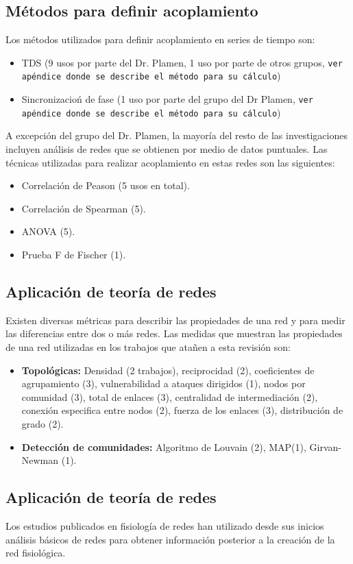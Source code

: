 \documentclass[twoside,twocolumn]{article}
\begin{document}
\subsection{Métodos para definir acoplamiento}
Los métodos utilizados para definir acoplamiento en series de tiempo son:
\begin{itemize}
  \item TDS (9 usos por parte del Dr. Plamen, 1 uso por parte de otros grupos, \texttt{ver apéndice donde se describe el método para su cálculo})
  \item Sincronizacioń de fase (1 uso por parte del grupo del Dr Plamen, \texttt{ver apéndice donde se describe el método para su cálculo})
\end{itemize}
A excepción del grupo del Dr. Plamen, la mayoría del resto de las investigaciones incluyen análisis de redes que se obtienen por medio de datos puntuales.
Las técnicas utilizadas para realizar acoplamiento en estas redes son las siguientes:
\begin{itemize}
  \item Correlación de Peason (5 usos en total).
  \item Correlación de Spearman (5).
  \item ANOVA (5).
  \item Prueba F de Fischer (1).
\end{itemize}

\subsection{Aplicación de teoría de redes}
Existen diversas métricas para describir las propiedades de una red y para medir las diferencias entre dos o más redes.
Las medidas que muestran las propiedades de una red utilizadas en los trabajos que atañen a esta revisión son:
\begin{itemize}
\item {\textbf{Topológicas:}} Densidad (2 trabajos), reciprocidad (2), coeficientes de agrupamiento (3), vulnerabilidad a ataques dirigidos (1), nodos por comunidad (3), total de enlaces (3), centralidad de intermediación (2), conexión especifica entre nodos (2), fuerza de los enlaces (3), distribución de grado (2).
\item {\textbf{Detección de comunidades:}} Algoritmo de Louvain (2), MAP(1), Girvan-Newman (1).
\end{itemize}

\subsection{Aplicación de teoría de redes}
Los estudios publicados en fisiología de redes han utilizado desde sus inicios análisis básicos de redes para obtener información posterior a la creación de la red fisiológica.
\end{document}
